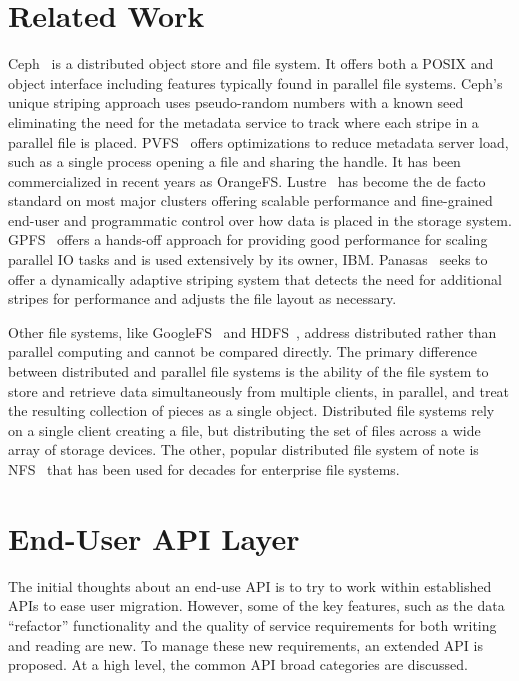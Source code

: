 \documentclass[letterpaper,twocolumn,10pt]{article}
\begin{document}
\section{Related Work}
\label{sec:related}

Ceph~\cite{weil:ceph} is a distributed object store and file system. It offers
both a POSIX and object interface including features typically found in parallel
file systems.
Ceph's unique striping approach uses pseudo-random numbers with a
known seed eliminating the need for the metadata service to track where each
stripe in a parallel file is placed.
PVFS~\cite{carns:pvfs} offers optimizations to reduce metadata server load,
such as a single process opening a file and sharing the handle.
It has been
commercialized in recent years as OrangeFS.
Lustre~\cite{braam:lustre-arch} has become the de facto standard on most major
clusters offering scalable performance and fine-grained end-user and
programmatic control over how data is placed in the storage system.
GPFS~\cite{schmuck:gpfs} offers a hands-off approach for providing good
performance for scaling parallel IO tasks and is used extensively by its owner,
IBM.
Panasas~\cite{panasas:architecture} seeks to offer a dynamically adaptive
striping system that detects the need for additional stripes for performance
and adjusts the file layout as necessary.

Other file systems, like GoogleFS~\cite{ghemawat:googlefs} and
HDFS~\cite{Shvachko:2010:hdfs}, address distributed rather than parallel
computing and cannot be compared directly.
The primary difference between
distributed and parallel file systems is the ability of the file system to
store and retrieve data simultaneously from multiple clients, in parallel, and
treat the resulting collection of pieces as a single object.  Distributed file
systems rely on a single client creating a file, but distributing the set of
files across a wide array of storage devices.
The other, popular distributed
file system of note is NFS~\cite{powlowski:1994:nfs3} that has been used for
decades for enterprise file systems.

\section{End-User API Layer}
\label{sec:end-user}

The initial thoughts about an end-use API is to try to work within established
APIs to ease user migration. However, some of the key features, such as the
data ``refactor'' functionality and the quality of service requirements for
both writing and reading are new. To manage these new requirements, an extended
API is proposed. At a high level, the common API broad categories are
discussed.
\end{document}
